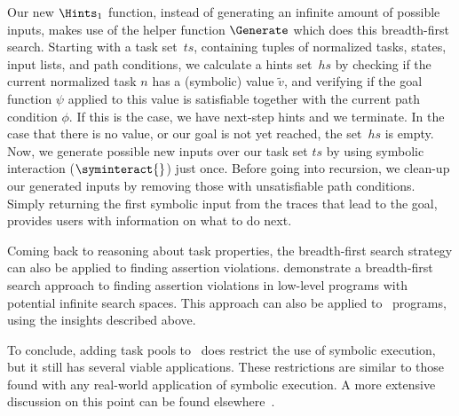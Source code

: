 Our new $\Hints_1$ function, instead of generating an infinite amount of possible inputs,
makes use of the helper function $\Generate$ which does this breadth-first search.
Starting with a task set~$ts$, containing tuples of normalized tasks, states, input lists, and path conditions,
we calculate a hints set~$hs$ by checking if the current normalized task $n$ has a (symbolic) value $\tilde{v}$,
and verifying if the goal function $\psi$ applied to this value is satisfiable together with the current path condition $\phi$.
If this is the case, we have next-step hints and we terminate.
In the case that there is no value, or our goal is not yet reached,
the set~$hs$ is empty.
Now, we generate possible new inputs over our task set $ts$ by using symbolic interaction ($\syminteract{}$) just once.
Before going into recursion, we clean-up our generated inputs by removing those with unsatisfiable path conditions.
Simply returning the first symbolic input from the traces that lead to the goal, provides users with information on what to do next.

Coming back to reasoning about task properties, the breadth-first search strategy can also be applied to finding assertion violations.
\citet{DBLP:conf/tap/NausVSR23} demonstrate a breadth-first search approach to finding assertion violations in low-level programs with potential infinite search spaces.
This approach can also be applied to \DYNTOPHAT\ programs, using the insights described above.

To conclude, adding task pools to \TOPHAT\ does restrict the use of symbolic execution, but it still has several viable applications.
These restrictions are similar to those found with any real-world application of symbolic execution.
A more extensive discussion on this point can be found elsewhere~\cite{conf/ifl/NausSK19}.